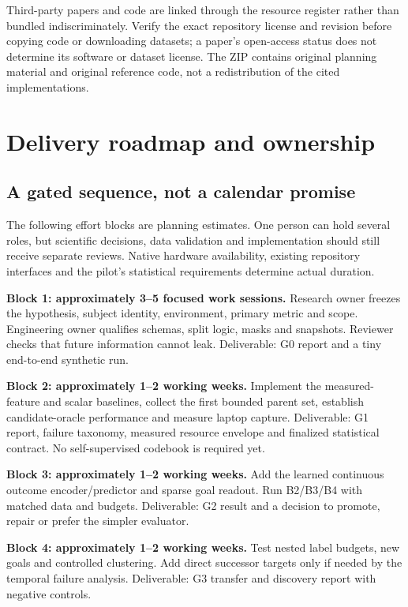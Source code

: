 \documentclass[
  11pt,
  a4paper,
]{article}
\begin{document}
Third-party papers and code are linked through the resource register
rather than bundled indiscriminately. Verify the exact repository
license and revision before copying code or downloading datasets; a
paper's open-access status does not determine its software or dataset
license. The ZIP contains original planning material and original
reference code, not a redistribution of the cited implementations.

\section{Delivery roadmap and
ownership}\label{delivery-roadmap-and-ownership}

\subsection{A gated sequence, not a calendar
promise}\label{a-gated-sequence-not-a-calendar-promise}

The following effort blocks are planning estimates. One person can hold
several roles, but scientific decisions, data validation and
implementation should still receive separate reviews. Native hardware
availability, existing repository interfaces and the pilot's statistical
requirements determine actual duration.

\textbf{Block 1: approximately 3--5 focused work sessions.} Research
owner freezes the hypothesis, subject identity, environment, primary
metric and scope. Engineering owner qualifies schemas, split logic,
masks and snapshots. Reviewer checks that future information cannot
leak. Deliverable: G0 report and a tiny end-to-end synthetic run.

\textbf{Block 2: approximately 1--2 working weeks.} Implement the
measured-feature and scalar baselines, collect the first bounded parent
set, establish candidate-oracle performance and measure laptop capture.
Deliverable: G1 report, failure taxonomy, measured resource envelope and
finalized statistical contract. No self-supervised codebook is required
yet.

\textbf{Block 3: approximately 1--2 working weeks.} Add the learned
continuous outcome encoder/predictor and sparse goal readout. Run
B2/B3/B4 with matched data and budgets. Deliverable: G2 result and a
decision to promote, repair or prefer the simpler evaluator.

\textbf{Block 4: approximately 1--2 working weeks.} Test nested label
budgets, new goals and controlled clustering. Add direct successor
targets only if needed by the temporal failure analysis. Deliverable: G3
transfer and discovery report with negative controls.
\end{document}
